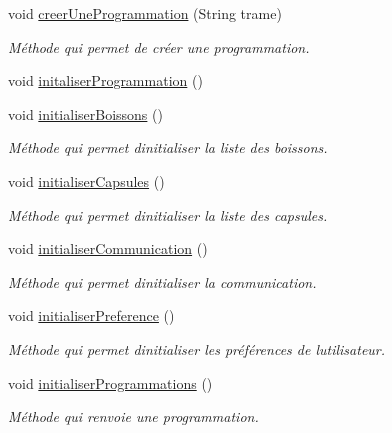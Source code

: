 \begin{DoxyCompactItemize}
void \hyperlink{classcom_1_1example_1_1ekawa_1_1_cafetiere_a8664d05f55227160182de50a7c31ccf3}{creer\+Une\+Programmation} (String trame)
\begin{DoxyCompactList}\small\item\em Méthode qui permet de créer une programmation. \end{DoxyCompactList}\item 
void \hyperlink{classcom_1_1example_1_1ekawa_1_1_cafetiere_aae065b86cdb3a8df2c904068aab7e9bf}{initaliser\+Programmation} ()
\item 
void \hyperlink{classcom_1_1example_1_1ekawa_1_1_cafetiere_ae9092a9540897e60c4cf7307073a75ab}{initialiser\+Boissons} ()
\begin{DoxyCompactList}\small\item\em Méthode qui permet d\textquotesingle{}initialiser la liste des boissons. \end{DoxyCompactList}\item 
void \hyperlink{classcom_1_1example_1_1ekawa_1_1_cafetiere_a75d0df422427eed8b12e7b46a6e11a35}{initialiser\+Capsules} ()
\begin{DoxyCompactList}\small\item\em Méthode qui permet d\textquotesingle{}initialiser la liste des capsules. \end{DoxyCompactList}\item 
void \hyperlink{classcom_1_1example_1_1ekawa_1_1_cafetiere_ad7c3e155b2ddf4dae05da8cd9c38518a}{initialiser\+Communication} ()
\begin{DoxyCompactList}\small\item\em Méthode qui permet d\textquotesingle{}initialiser la communication. \end{DoxyCompactList}\item 
void \hyperlink{classcom_1_1example_1_1ekawa_1_1_cafetiere_a20f3b74112d4e668a382882c4c8ccd07}{initialiser\+Preference} ()
\begin{DoxyCompactList}\small\item\em Méthode qui permet d\textquotesingle{}initialiser les préférences de l\textquotesingle{}utilisateur. \end{DoxyCompactList}\item 
void \hyperlink{classcom_1_1example_1_1ekawa_1_1_cafetiere_a406e5771edb1663ebb1fc571365b75ac}{initialiser\+Programmations} ()
\begin{DoxyCompactList}\small\item\em Méthode qui renvoie une programmation. \end{DoxyCompactList}\item 

\end{DoxyCompactItemize}
